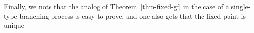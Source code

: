 \documentclass[11pt]{article}
\theoremstyle{plain}
\theoremstyle{definition}
\numberwithin{equation}{section}
\begin{document}

Finally, we note that the analog of Theorem~\ref{thm-fixed-gf} in the case of a single-type branching process is easy to prove, and one also gets that the fixed point is unique. 
\end{document}
